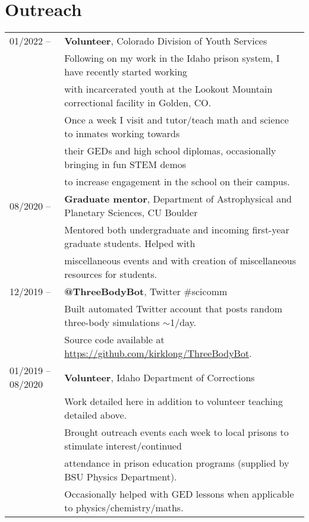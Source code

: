 \documentclass[11pt]{article}
\begin{document}
\section {Outreach}
\begin{tabular}{ll}
01/2022 --    &   \textbf{Volunteer}, Colorado Division of Youth Services  \\
      & Following on my work in the Idaho prison system, I have recently started working\\
      & with incarcerated youth at the Lookout Mountain correctional facility in Golden, CO.\\
      & Once a week I visit and tutor/teach math and science to inmates working towards\\
      & their GEDs and high school diplomas, occasionally bringing in fun STEM demos\\
      & to increase engagement in the school on their campus.\vspace{2mm}\\
08/2020 --    &   \textbf{Graduate mentor}, Department of Astrophysical and Planetary Sciences, CU Boulder \vspace{2mm} \\
      & Mentored both undergraduate and incoming first-year graduate students. Helped with \\
      & miscellaneous events and with creation of miscellaneous resources for students. \vspace{2mm}\\
12/2019 --    &   \textbf{@ThreeBodyBot}, Twitter \#scicomm \vspace{1mm} \\
      & Built automated Twitter account that posts random three-body simulations $\sim$1/day. \\
      & Source code available at \url{https://github.com/kirklong/ThreeBodyBot}. \vspace{2mm}\\
01/2019 -- 08/2020    &   \textbf{Volunteer}, Idaho Department of Corrections  \\
      & Work detailed here in addition to volunteer teaching detailed above. \vspace{1mm} \\
      & Brought outreach events each week to local prisons to stimulate interest/continued \\
      & attendance in prison education programs (supplied by BSU Physics Department). \\
      & Occasionally helped with GED lessons when applicable to physics/chemistry/maths.\vspace{1mm}\\

\end{tabular}
\end{document}
